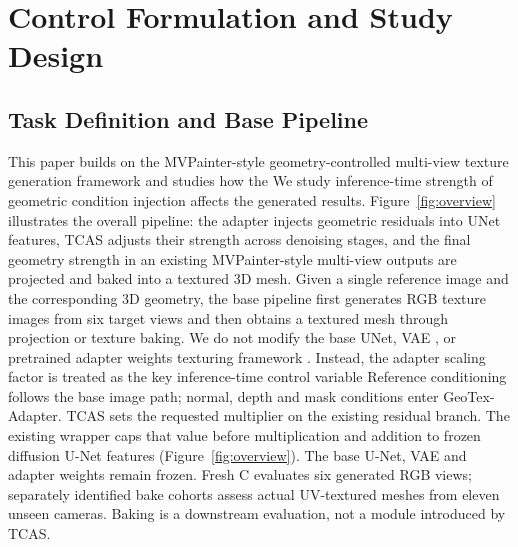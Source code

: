 \documentclass[times,twocolumn,final]{elsarticle}
\providecommand{\DIFadd}[1]{{\protect\color{blue} \sf #1}} %
\providecommand{\DIFdel}[1]{{\protect\color{red} \scriptsize #1}} %
\providecommand{\DIFaddbegin}{} %
\providecommand{\DIFaddend}{} %
\providecommand{\DIFdelbegin}{} %
\providecommand{\DIFdelend}{} %
\begin{document}
\DIFdelbegin %
\DIFdelend \DIFaddbegin \section{Control Formulation and Study Design}
\DIFaddend \label{sec:method}

\subsection{Task Definition and Base Pipeline}
\label{subsec:task}

\DIFdelbegin \DIFdel{This paper builds on the MVPainter-style geometry-controlled multi-view texture generation framework \cite{shao2025mvpainter}and studies how the }\DIFdelend \DIFaddbegin \DIFadd{We study }\DIFaddend inference-time \DIFdelbegin \DIFdel{strength of geometric condition injection affects the generated results. Figure~\ref{fig:overview} illustrates the overall pipeline: the adapter injects geometric residuals into UNet features, TCAS adjusts their strength across denoising stages, and the final }\DIFdelend \DIFaddbegin \DIFadd{geometry strength in an existing MVPainter-style }\DIFaddend multi-view \DIFdelbegin \DIFdel{outputs are projected and baked into a textured 3D mesh. Given a single reference image and the corresponding 3D geometry, the base pipeline first generates RGB texture images from six target views and then obtains a textured mesh through projection or texture baking. We do not modify the base UNet, VAE , or pretrained adapter weights }\DIFdelend \DIFaddbegin \DIFadd{texturing framework \cite{shao2025mvpainter}}\DIFaddend . \DIFdelbegin \DIFdel{Instead, the adapter scaling factor is treated as the key inference-time control variable}\DIFdelend \DIFaddbegin \DIFadd{Reference conditioning follows the base image path; normal, depth and mask conditions enter GeoTex-Adapter. TCAS sets the requested multiplier on the existing residual branch. The existing wrapper caps that value before multiplication and addition to frozen diffusion U-Net features (Figure~\ref{fig:overview}). The base U-Net, VAE and adapter weights remain frozen. Fresh C evaluates six generated RGB views; separately identified bake cohorts assess actual UV-textured meshes from eleven unseen cameras. Baking is a downstream evaluation, not a module introduced by TCAS}\DIFaddend .
\end{document}
